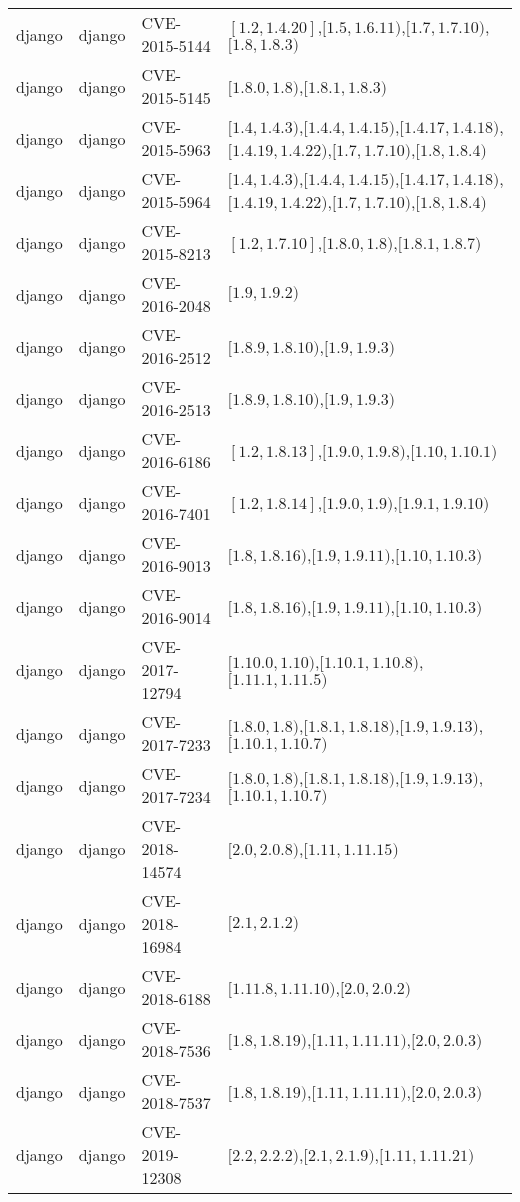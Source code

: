 \begin{tabular}{llll}
django & django & CVE-2015-5144 & $[1.2,1.4.20]$,$[1.5,1.6.11)$,$[1.7,1.7.10)$,$[1.8,1.8.3)$ \\
django & django & CVE-2015-5145 & $[1.8.0,1.8)$,$[1.8.1,1.8.3)$ \\
django & django & CVE-2015-5963 & $[1.4,1.4.3)$,$[1.4.4,1.4.15)$,$[1.4.17,1.4.18)$,$[1.4.19,1.4.22)$,$[1.7,1.7.10)$,$[1.8,1.8.4)$ \\
django & django & CVE-2015-5964 & $[1.4,1.4.3)$,$[1.4.4,1.4.15)$,$[1.4.17,1.4.18)$,$[1.4.19,1.4.22)$,$[1.7,1.7.10)$,$[1.8,1.8.4)$ \\
django & django & CVE-2015-8213 & $[1.2,1.7.10]$,$[1.8.0,1.8)$,$[1.8.1,1.8.7)$ \\
django & django & CVE-2016-2048 & $[1.9,1.9.2)$ \\
django & django & CVE-2016-2512 & $[1.8.9,1.8.10)$,$[1.9,1.9.3)$ \\
django & django & CVE-2016-2513 & $[1.8.9,1.8.10)$,$[1.9,1.9.3)$ \\
django & django & CVE-2016-6186 & $[1.2,1.8.13]$,$[1.9.0,1.9.8)$,$[1.10,1.10.1)$ \\
django & django & CVE-2016-7401 & $[1.2,1.8.14]$,$[1.9.0,1.9)$,$[1.9.1,1.9.10)$ \\
django & django & CVE-2016-9013 & $[1.8,1.8.16)$,$[1.9,1.9.11)$,$[1.10,1.10.3)$ \\
django & django & CVE-2016-9014 & $[1.8,1.8.16)$,$[1.9,1.9.11)$,$[1.10,1.10.3)$ \\
django & django & CVE-2017-12794 & $[1.10.0,1.10)$,$[1.10.1,1.10.8)$,$[1.11.1,1.11.5)$ \\
django & django & CVE-2017-7233 & $[1.8.0,1.8)$,$[1.8.1,1.8.18)$,$[1.9,1.9.13)$,$[1.10.1,1.10.7)$ \\
django & django & CVE-2017-7234 & $[1.8.0,1.8)$,$[1.8.1,1.8.18)$,$[1.9,1.9.13)$,$[1.10.1,1.10.7)$ \\
django & django & CVE-2018-14574 & $[2.0,2.0.8)$,$[1.11,1.11.15)$ \\
django & django & CVE-2018-16984 & $[2.1,2.1.2)$ \\
django & django & CVE-2018-6188 & $[1.11.8,1.11.10)$,$[2.0,2.0.2)$ \\
django & django & CVE-2018-7536 & $[1.8,1.8.19)$,$[1.11,1.11.11)$,$[2.0,2.0.3)$ \\
django & django & CVE-2018-7537 & $[1.8,1.8.19)$,$[1.11,1.11.11)$,$[2.0,2.0.3)$ \\
django & django & CVE-2019-12308 & $[2.2,2.2.2)$,$[2.1,2.1.9)$,$[1.11,1.11.21)$ \\

\end{tabular}

